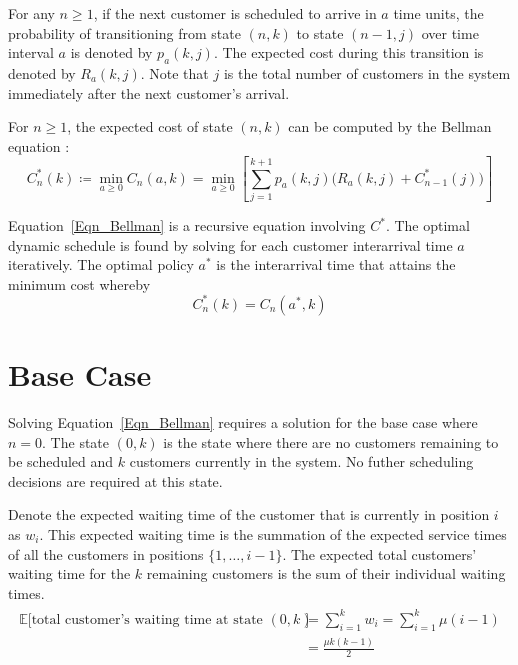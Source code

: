 For any $n \geq 1$, if the next customer is scheduled to arrive in $a$ time units, the probability of transitioning from state $(n, k)$ to state $(n - 1, j)$ over time interval $a$ is denoted by $p_{a} (k, j)$. The expected cost during this transition is denoted by $R_{a} (k, j)$. Note that $j$ is the total number of customers in the system immediately after the next customer's arrival.

For $n \geq 1$, the expected cost of state $(n, k)$ can be computed by the Bellman equation \citep{Bellman}:
\begin{equation}
	C_{n}^{*} (k) \coloneqq \min_{a \geq 0} C_{n} (a, k) = \min_{a \geq 0} \left[ \sum_{j = 1}^{k + 1} p_{a} (k, j) \Big( R_{a} (k, j) + C_{n - 1}^{*} (j) \Big) \right]
	\label{Eqn_Bellman}
\end{equation}

Equation~\ref{Eqn_Bellman} is a recursive equation involving $C^{*}$. The optimal dynamic schedule is found by solving for each customer interarrival time $a$ iteratively. The optimal policy $a^{*}$ is the interarrival time that attains the minimum cost whereby
\begin{equation}
	C_{n}^{*} (k) = C_{n} (a^{*}, k)
\end{equation}

\section{Base Case}
Solving Equation~\ref{Eqn_Bellman} requires a solution for the base case where $n = 0$. The state $(0, k)$ is the state where there are no customers remaining to be scheduled and $k$ customers currently in the system. No futher scheduling decisions are required at this state.

Denote the expected waiting time of the customer that is currently in position $i$ as $w_{i}$. This expected waiting time is the summation of the expected service times of all the customers in positions $\{ 1, \ldots, i - 1 \}$. The expected total customers' waiting time for the $k$ remaining customers is the sum of their individual waiting times.
\begin{align}
	\begin{split}
		\mathbb{E} \Big[\text{total customer's waiting time at state $(0, k)$} \Big] & = \sum_{i = 1}^{k} w_{i} = \sum_{i = 1}^{k} \mu (i - 1) \\
		& = \frac{\mu k (k - 1)}{2}
	\end{split}
\end{align}

